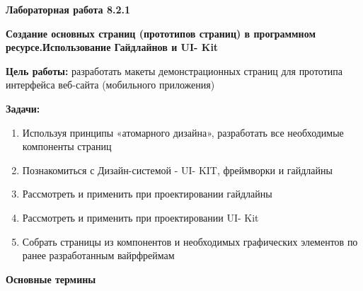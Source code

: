 
\graphicspath{ {8.2.1/models/} }
\usepackage{hyperref}

\pagestyle{fancy}
\fancyhead{}
\renewcommand{\headrulewidth}{0pt}


\begin{center}
    \textbf{Лабораторная работа 8.2.1}

    \textbf{Создание основных страниц (прототипов страниц) в программном ресурсе.Использование Гайдлайнов и UI- Kit}
\end{center}

\textbf{Цель работы:} разработать макеты демонстрационных страниц для прототипа интерфейса веб-сайта (мобильного приложения)
\bigskip

\textbf{Задачи:}

\begin{enumerate}
    \item Используя принципы «атомарного дизайна», разработать все необходимые компоненты страниц
    \item Познакомиться с Дизайн-системой - UI- KIT, фреймворки и гайдлайны
    \item Рассмотреть и применить при проектировании гайдлайны
    \item Рассмотреть и применить при проектировании UI- Kit
    \item Собрать страницы из компонентов и необходимых графических элементов по ранее разработанным вайрфреймам
\end{enumerate}
\bigskip

\textbf{Основные термины}

